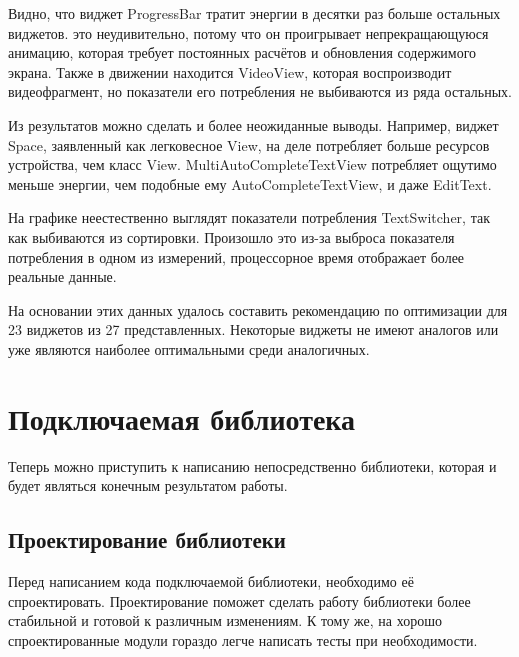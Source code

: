 \documentclass[a4paper,14pt]{extarticle} %
\begin{document}
	Видно, что виджет ProgressBar тратит энергии в десятки раз больше остальных виджетов. это неудивительно, потому что он проигрывает непрекращающуюся анимацию, которая требует постоянных расчётов и обновления содержимого экрана. Также в движении находится VideoView, которая воспроизводит видеофрагмент, но показатели его потребления не выбиваются из ряда остальных.
	
	Из результатов можно сделать и более неожиданные выводы. Например, виджет Space, заявленный как легковесное View, на деле потребляет больше ресурсов устройства, чем класс View. MultiAutoCompleteTextView потребляет ощутимо меньше энергии, чем подобные ему AutoCompleteTextView, и даже EditText.

	
	На графике неестественно выглядят показатели потребления TextSwitcher, так как выбиваются из сортировки. Произошло это из-за выброса показателя потребления в одном из измерений, процессорное время отображает более реальные данные.
	
	На основании этих данных удалось составить рекомендацию по оптимизации для 23 виджетов из 27 представленных. Некоторые виджеты не имеют аналогов или уже являются наиболее оптимальными среди аналогичных.
	
	\clearpage
	\section{Подключаемая библиотека}
	
	Теперь можно приступить к написанию непосредственно библиотеки, которая и будет являться конечным результатом работы.
	
	\subsection{Проектирование библиотеки}
	
	Перед написанием кода подключаемой библиотеки, необходимо её спроектировать. Проектирование поможет сделать работу библиотеки более стабильной и готовой к различным изменениям. К тому же, на хорошо спроектированные модули гораздо легче написать тесты при необходимости. 
	
\end{document}
